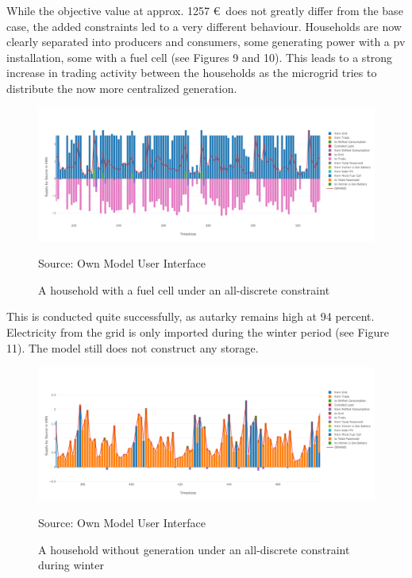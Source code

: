 \documentclass[
	11pt,								%
	DIV10,								%
	a4paper,         					%
	oneside,							%
	headheight=20pt,					%
	footheight=20pt,					%
    parskip=full,						%
    listof=totoc,						%
	bibliography=totoc,					%
	index=totoc,						%
]{scrartcl}
\begin{document}
	While the objective value at approx. 1257 \euro\ does not greatly differ from the base case, the added constraints led to a very different behaviour. Households are now clearly separated into producers and consumers, some generating power with a pv installation, some with a fuel cell (see Figures 9 and 10). This leads to a strong increase in trading activity between the households as the microgrid tries to distribute the now more centralized generation.
	
\begin{figure}[H]
	\centering
	\includegraphics[width=1\textwidth]{pictures/RES_8_DISC.png}
	\caption{A household with a fuel cell under an all-discrete constraint}
	\label{commercial_dispatch_base}
	\flushleft\quad\quad\footnotesize{Source: Own Model User Interface}
\end{figure}	
This is conducted quite successfully, as autarky remains high at 94 percent. Electricity from the grid is only imported during the winter period (see Figure 11). The model still does not construct any storage.

\begin{figure}[H]
	\centering
	\includegraphics[width=1\textwidth]{pictures/RES_6_DISC.png}
	\caption{A household without generation under an all-discrete constraint during winter}
	\label{commercial_dispatch_base}
	\flushleft\quad\quad\footnotesize{Source: Own Model User Interface}
\end{figure}	
\end{document}
